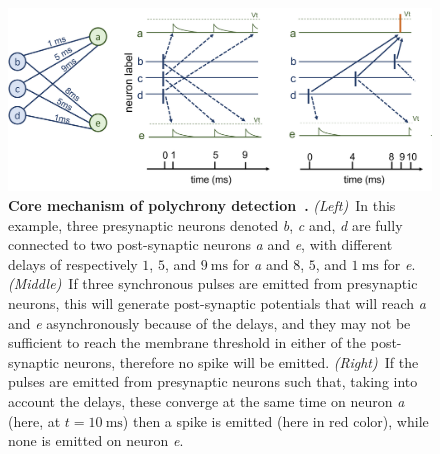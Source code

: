 \documentclass[brainsci, %
               review,submit,pdftex,moreauthors
               ]{Definitions/mdpi}
\newcommand{\ms}{\si{\milli\second}}%
\begin{document}
\begin{figure}%
  \centering
  \includegraphics[width=0.980\linewidth]{figures/izhikevitch_repro.png}
    \caption{\textbf{Core mechanism of polychrony detection~\citep{izhikevich_polychronization_2006}.} \textit{(Left)}~In this example, three presynaptic neurons denoted \textit{b}, \textit{c} and, \textit{d} are fully connected to two post-synaptic neurons \textit{a} and \textit{e}, with different delays of respectively $1$, $5$, and $9~\ms$ for \textit{a} and  $8$, $5$, and $1~\ms$ for \textit{e}. \textit{(Middle)}~If three synchronous pulses are emitted from presynaptic neurons, this will generate post-synaptic potentials that will reach \textit{a} and \textit{e} asynchronously because of the delays, and they may not be sufficient to reach the membrane threshold in either of the post-synaptic neurons, therefore no spike will be emitted.
    \textit{(Right)}~If the pulses are emitted from presynaptic neurons such that, taking into account the delays, these converge at the same time on neuron \textit{a} (here, at $t=10~\ms$) then a spike is emitted (here in red color), while none is emitted on neuron \textit{e}.
     }
  \label{fig:izhikevitch}
\end{figure}
% 
\end{document}
